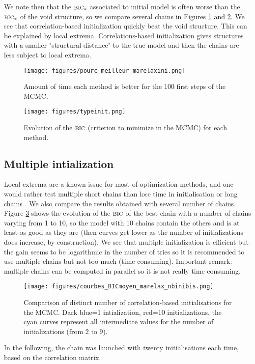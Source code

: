 \documentclass[12pt,a4paper]{report}
\begin{document}
		We note then that the $\mbox{{\sc bic}}_*$ associated to initial model is often worse than the $\mbox{{\sc bic}}_*$ of the void structure, so we compare several chains in Figures \ref{pourcini} and \ref{Bicini}.			
				We see that correlation-based initialization quickly beat the void structure. This can be explained by local extrema. Correlations-based initialization gives structures with a smaller "structural distance" to the true model and then the chains are less subject to local extrema.

	\begin{center}
		\begin{figure}[h!]
		\centering
		\texttt{[image: figures/pourc\_meilleur\_marelaxini.png]} 
		\caption{Amount of time each method is better for the 100 first steps of the MCMC. } \label{pourcini}
		\end{figure}		
	\end{center}
	
	\begin{center}
		\begin{figure}[h!]
		\centering
		\texttt{[image: figures/typeinit.png]} %
		\caption{Evolution of the $\mbox{{\sc bic}}$ (criterion to minimize in the MCMC) for each method.}\label{Bicini}
		\end{figure}
	\end{center}
	\FloatBarrier
		\subsection{Multiple intialization}	
		Local extrema are a known issue for most of optimization methods, and one would rather test multiple short chains than lose time in initialisation or long chains \cite{gilks1996markov}. 
		We also compare the results obtained with several number of chains. Figure \ref{nbini} shows the evolution of the $\mbox{{\sc bic}}$ of the best chain with a number of chains varying from 1 to 10, so the model with 10 chains contain the others and is at least as good as they are (then curves get lower as the number of initializations does increase, by construction). We see that multiple initialization is efficient but the gain seems to be logarithmic in the number of tries so it is recommended to use multiple chains but not too much (time consuming). Important remark: multiple chains can be computed in parallel so it is not really time consuming.		
			
	\begin{center}
	\begin{figure}[h!]
	\centering
		\texttt{[image: figures/courbes\_BICmoyen\_marelax\_nbinibis.png]} 
		\caption{Comparison of distinct number of correlation-based initialisations for the MCMC. Dark blue=1 intialization, red=10 initializations, the cyan curves represent all intermediate values for the number of initializations (from 2 to 9).}\label{nbini}
	\end{figure}
	\end{center}
		In the following, the chain was launched with twenty initialisations each time, based on the correlation matrix.
\end{document}
